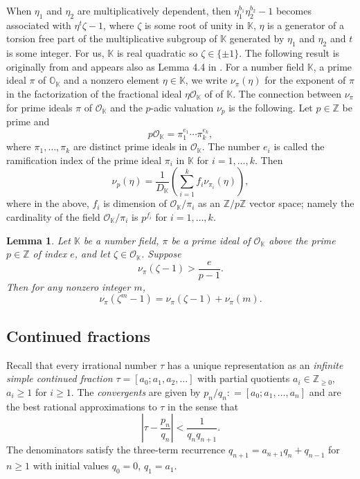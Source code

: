 \documentclass[11pt,a4paper]{article}
\newtheorem{lemma}[theorem]{Lemma}
\numberwithin{equation}{section}
\numberwithin{table}{section}
\numberwithin{figure}{section}
\begin{document}
When $\eta_1$ and $\eta_2$ are multiplicatively dependent, then $\eta_1^{b_1}\eta_2^{b_2}-1$ becomes associated with $\eta^t\zeta-1$, where $\zeta$ is some root of unity in 
${\mathbb K}$, $\eta$ is a generator of a torsion free part of the multiplicative subgroup of ${\mathbb K}$ generated by $\eta_1$ and $\eta_2$ and $t$ is some integer. For us, ${\mathbb K}$ 
is real quadratic so $\zeta\in \{\pm 1\}$. The following result is originally from \cite{post} and appears also as Lemma 4.4 in \cite{BiLu}. For a number field ${\mathbb K}$, a prime ideal 
$\pi$ of ${\mathbb O}_{\mathbb K}$ and a nonzero element $\eta\in {\mathbb K}$, we write $\nu_{\pi}(\eta)$ for the exponent of $\pi$ in the factorization of the fractional ideal $\eta{\mathcal O}_{\mathbb K}$ of 
of ${\mathbb K}$. The connection between $\nu_{\pi}$ for prime ideals $\pi$ of ${\mathcal O}_{\mathbb K}$ and the $p$-adic valuation $\nu_p$ is the following. Let $p\in {\mathbb Z}$ be prime and
$$
p{\mathcal O}_{\mathbb K}=\pi_1^{e_1}\cdots \pi_k^{e_k},
$$
where $\pi_1,\ldots,\pi_k$  are distinct prime ideals in ${\mathcal O}_{\mathbb K}$. The number $e_i$ is called the ramification index of the prime ideal $\pi_i$ in ${\mathbb K}$ for $i=1,\ldots,k$.  Then 
\begin{equation}
\label{eq:nup}
\nu_p(\eta)=\frac{1}{D_{\mathbb K}}\left(\sum_{i=1}^k f_i\nu_{\pi_i}(\eta)\right),
\end{equation}
where in the above, $f_i$ is dimension of ${\mathcal O}_{\mathbb K}/\pi_i$ as an ${\mathbb Z}/p{\mathbb Z}$ vector space; namely the cardinality of the field ${\mathcal O}_{\mathbb K}/\pi_i$ is $p^{f_i}$ for $i=1,\ldots,k$. 



\begin{lemma}
\label{lem:BiLu}
	Let $\mathbb{K}$ be a number field, $\pi$ be a prime ideal 
	of $\mathcal{O}_{\mathbb{K}}$ above the prime $p\in {\mathbb Z}$ of
	index $e$, and let $\zeta \in \mathcal{O}_{\mathbb{K}}$. Suppose 
	$$\nu_{\pi}(\zeta - 1) > \frac{e}{p - 1}.
	$$
	Then for any nonzero integer $m$,
	$$
	\nu_{\pi}(\zeta^m - 1) = \nu_{\pi}(\zeta - 1) + \nu_{\pi}(m).
	$$
\end{lemma}

\subsection{Continued fractions}

Recall that every irrational number $\tau$ has a unique representation as an \emph{infinite simple continued fraction} $\tau = [a_0; a_1, a_2, \ldots]$ with partial quotients $a_i \in \mathbb{Z}_{\geq 0}$, $a_i \geq 1$ for
$i \geq 1$. The \emph{convergents} are given by $p_n/q_n: = [a_0; a_1, \ldots, a_n]$ and are the best rational approximations to $\tau$ in the sense that
\begin{equation*}
	\left|\tau - \frac{p_n}{q_n}\right| < \frac{1}{q_n q_{n+1}}.
\end{equation*}
The denominators satisfy the three-term recurrence
$q_{n+1} = a_{n+1}q_n + q_{n-1}$ for $n\ge 1$ with initial values $q_0=0$, $q_1=a_1$.
\end{document}
